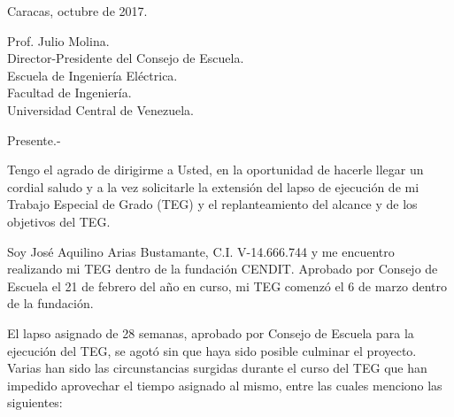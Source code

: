 \documentclass[paper=letter,oneside,fontsize=12pt, parskip=full]{article}
\begin{document}
	\begin{flushright}		
		\large
		Caracas, octubre de 2017. \\	
	\end{flushright}

	
	\begin{onehalfspace}
		\large
		Prof. Julio Molina. \\
		Director-Presidente del Consejo de Escuela. \\
		Escuela de Ingeniería Eléctrica. \\
		Facultad de Ingeniería. \\
		Universidad Central de Venezuela.	
	\end{onehalfspace}

	Presente.- 
	
	Tengo el agrado de dirigirme a Usted, en la oportunidad de hacerle llegar un cordial saludo y a la vez solicitarle la extensión del lapso de ejecución de mi Trabajo Especial de Grado (TEG) y el replanteamiento del alcance y de los objetivos del TEG.
	 
	Soy José Aquilino Arias Bustamante, C.I. V-14.666.744 y me encuentro realizando mi TEG dentro de la fundación CENDIT. Aprobado por Consejo de Escuela el 21 de febrero del año en curso, mi TEG comenzó el 6 de marzo dentro de la fundación.
	
	El lapso asignado de 28 semanas, aprobado por Consejo de Escuela para la ejecución del TEG, se agotó sin que haya sido posible culminar el proyecto. Varias han sido las circunstancias surgidas durante el curso del TEG que han impedido aprovechar el tiempo asignado al mismo, entre las cuales menciono las siguientes:
	
\end{document}
